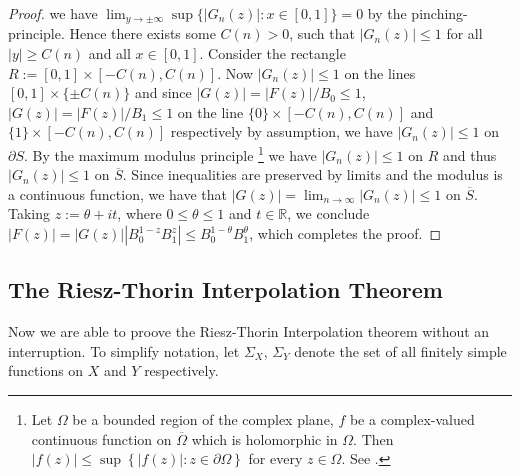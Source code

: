 \begin{proof}
	we have $\lim_{y \to \pm \infty}\sup\{\left| G_n(z)\right| : x \in [0,1]\} = 0$ by the pinching-principle. Hence there exists some $C(n) > 0$, such that $\left| G_n(z) \right| \leqslant 1$ for all $\left| y \right| \geqslant C(n)$ and all $x \in [0,1]$. Consider the rectangle $R := [0,1] \times [-C(n),C(n)]$. Now $\left| G_n(z) \right| \leqslant 1$ on the lines $[0,1] \times \{\pm C(n)\}$ and since $\left| G(z) \right| = \left| F(z)\right|/B_0 \leqslant 1$, $\left| G(z) \right| = \left| F(z) \right|/B_1 \leqslant 1$ on the line $\{0\} \times [-C(n),C(n)]$ and $\{1\} \times [-C(n),C(n)]$ respectively by assumption, we have $\left| G_n(z) \right| \leqslant 1$ on $\partial S$. By the maximum modulus principle \footnote{
						Let $\Omega$ be a bounded region of the complex plane, $f$ be a complex-valued continuous function on $\overline{\Omega}$ which is holomorphic in $\Omega$. Then $\left| f(z) \right| \leqslant \sup\left\{ \left| f(z) \right| : z \in \partial \Omega\right\}$ for every $z \in \Omega$. See \cite[253]{rudin:rc_analysis:1987}.}
	we have $\left| G_n(z) \right| \leqslant 1$ on $R$ and thus $\left| G_n(z) \right| \leqslant 1$ on $\overline{S}$. Since inequalities are preserved by limits and the modulus is a continuous function, we have that $\left| G(z) \right| = \lim_{n \to \infty} \left| G_n(z) \right| \leqslant 1$ on $\overline{S}$. Taking $z := \theta + it$, where $0 \leqslant \theta \leqslant 1$ and $t \in \mathbb{R}$, we conclude $\left| F(z) \right| = \left| G(z) \right| \left| B_0^{1 - z}B_1^z\right| \leqslant B_0^{1 - \theta} B_1^{\theta}$, which completes the proof.
\end{proof}

\subsection{The Riesz-Thorin Interpolation Theorem}
Now we are able to proove the Riesz-Thorin Interpolation theorem without an interruption. To simplify notation, let $\Sigma_X$, $\Sigma_Y$ denote the set of all finitely simple functions on $X$ and $Y$ respectively.

\vspace{2mm}

